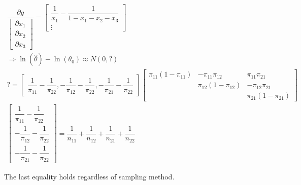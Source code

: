 \begin{equation*}
  \begin{gathered}
    \dfrac{\partial g}{\begin{bmatrix}\partial x_1\\\partial x_2\\\partial x_3\end{bmatrix}} = \begin{bmatrix}\dfrac{1}{x_1}-\dfrac{1}{1-x_1-x_2-x_3}\\\vdots\end{bmatrix}\\
    \Rightarrow \ln{\left(\widehat{\theta}\right)}-\ln{\left(\theta_0\right)}\approx N(0,?)\\
    ? = \begin{bmatrix}\dfrac{1}{\pi_{11}}-\dfrac{1}{\pi_{22}}, -\dfrac{1}{\pi_{12}}-\dfrac{1}{\pi_{22}}, -\dfrac{1}{\pi_{21}}-\dfrac{1}{\pi_{22}}\end{bmatrix}\begin{bmatrix}\pi_{11}(1-\pi_{11})&-\pi_{11}\pi_{12}&\pi_{11}\pi_{21}\\&\pi_{12}(1-\pi_{12})&-\pi_{12}\pi_{21}\\&&\pi_{21}(1-\pi_{21})\end{bmatrix}\\
    \begin{bmatrix}
      \dfrac{1}{\pi_{11}}-\dfrac{1}{\pi_{22}}\\
      -\dfrac{1}{\pi_{12}}-\dfrac{1}{\pi_{22}}\\
      -\dfrac{1}{\pi_{21}}-\dfrac{1}{\pi_{22}}
    \end{bmatrix} = \dfrac{1}{n_{11}}+\dfrac{1}{n_{12}}+\dfrac{1}{n_{21}}+\dfrac{1}{n_{22}}
  \end{gathered}
\end{equation*}\par
\noindent The last equality holds regardless of sampling method. 
